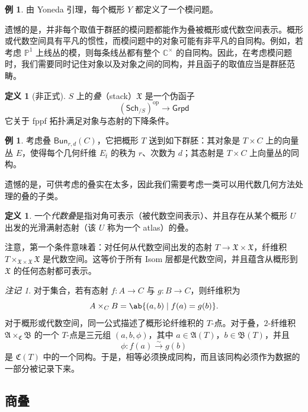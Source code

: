 \documentclass{amsart}
\theoremstyle{definition}
\newtheorem{defn}[thm]{定义}
\newtheorem{exm}[thm]{例}
\theoremstyle{remark}
\newtheorem{rmk}[thm]{注记}
\theoremstyle{plain}
\theoremstyle{definition}
\theoremstyle{remark}
\newcommand{\C}{\mathbb{C}}
\renewcommand{\P}{\mathbb{P}}
\newcommand{\mf}[1]{\mathfrak{#1}}
\newcommand{\mr}[1]{\mathrm{#1}}
\newcommand{\ms}[1]{\mathsf{#1}}
\newcommand{\1}{\mathbf{1}}
\newcommand{\2}{\mathbf{2}}
\newcommand{\3}{\mathbf{3}}
\begin{document}
\begin{exm}
    由 Yoneda 引理，每个概形 \(Y\) 都定义了一个模问题。
\end{exm}

遗憾的是，并非每个取值于群胚的模问题都能作为叠被概形或代数空间表示。概形或代数空间具有平凡的惯性，而模问题中的对象可能有非平凡的自同构。例如，若考虑 \(\P^1\) 上线丛的模，则每条线丛都有整个 \(\C^{\times}\) 的自同构。因此，在考虑模问题时，我们需要同时记住对象以及对象之间的同构，并且函子的取值应当是群胚范畴。

\begin{defn}[非正式]
    \(S\) 上的\textit{叠}（stack）\(\mf{X}\) 是一个伪函子
    \[ (\ms{Sch}_{/S})^{\mr{op}} \to \ms{Grpd} \]
    它关于 fppf 拓扑满足对象与态射的下降条件。
\end{defn}

\begin{exm}
    考虑叠 \(\ms{Bun}_{r,d}(C)\)，它把概形 \(T\) 送到如下群胚：其对象是 \(T\times C\) 上的向量丛 \(E\)，使得每个几何纤维 \(E_{\bar t}\) 的秩为 \(r\)、次数为 \(d\)；其态射是 \(T\times C\) 上向量丛的同构。
\end{exm}

遗憾的是，可供考虑的叠实在太多，因此我们需要考虑一类可以用代数几何方法处理的叠的子类。

\begin{defn}
    一个\textit{代数叠}是指对角可表示（被代数空间表示）、并且存在从某个概形 \(U\) 出发的光滑满射态射（该 \(U\) 称为一个 atlas）的叠。
\end{defn}

注意，第一个条件意味着：对任何从代数空间出发的态射 \(T \to \mf{X} \times \mf{X}\)，纤维积 \(T \times_{\mf{X} \times \mf{X}} \mf{X}\) 是代数空间。这等价于所有 Isom 层都是代数空间，并且蕴含从概形到 \(\mf{X}\) 的任何态射都可表示。

\begin{rmk}
    对于集合，若有态射 \(f\colon A\to C\) 与 \(g\colon B\to C\)，则纤维积为
    \[ 
        A\times_C B=\ab\{(a,b)\mid f(a)=g(b)\}. 
    \] 
    对于概形或代数空间，同一公式描述了概形论纤维积的 \(T\)-点。对于叠，\(2\)-纤维积 \(\mf{A}\times_{\mf{C}}\mf{B}\) 的一个 \(T\)-点是三元组 \((a,b,\phi)\)，其中 \(a\in\mf{A}(T)\)，\(b\in\mf{B}(T)\)，并且
    \[ 
        \phi\colon f(a)\xrightarrow{\sim}g(b) 
    \]
    是 \(\mf{C}(T)\) 中的一个同构。于是，相等必须换成同构，而且该同构必须作为数据的一部分被记录下来。
\end{rmk}


\subsection{商叠}%
\label{sub:Quotient stacks}
\end{document}
